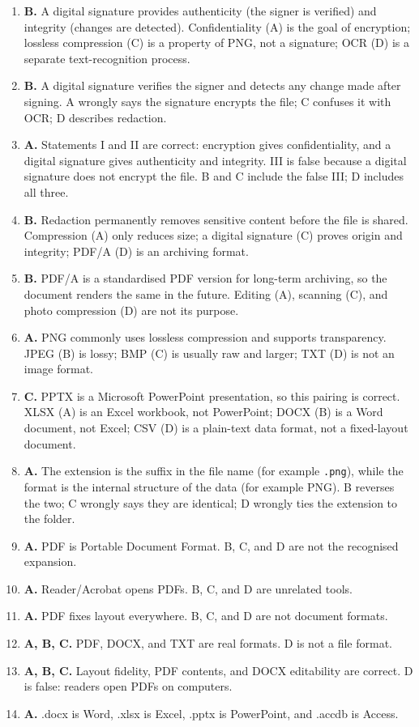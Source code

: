 \begin{enumerate}[label=\textbf{Q\arabic*.}, leftmargin=*]
  (B) and integrity (C) are the goals of a digital signature; compression (D)
  is unrelated to password protection.
\item \textbf{B.} A digital signature provides authenticity (the signer is
  verified) and integrity (changes are detected). Confidentiality (A) is the
  goal of encryption; lossless compression (C) is a property of PNG, not a
  signature; OCR (D) is a separate text-recognition process.
\item \textbf{B.} A digital signature verifies the signer and detects any
  change made after signing. A wrongly says the signature encrypts the file;
  C confuses it with OCR; D describes redaction.
\item \textbf{A.} Statements I and II are correct: encryption gives
  confidentiality, and a digital signature gives authenticity and integrity.
  III is false because a digital signature does not encrypt the file. B and C
  include the false III; D includes all three.
\item \textbf{B.} Redaction permanently removes sensitive content before the
  file is shared. Compression (A) only reduces size; a digital signature (C)
  proves origin and integrity; PDF/A (D) is an archiving format.
\item \textbf{B.} PDF/A is a standardised PDF version for long-term
  archiving, so the document renders the same in the future. Editing (A),
  scanning (C), and photo compression (D) are not its purpose.
\item \textbf{A.} PNG commonly uses lossless compression and supports
  transparency. JPEG (B) is lossy; BMP (C) is usually raw and larger; TXT (D)
  is not an image format.
\item \textbf{C.} PPTX is a Microsoft PowerPoint presentation, so this pairing
  is correct. XLSX (A) is an Excel workbook, not PowerPoint; DOCX (B) is a
  Word document, not Excel; CSV (D) is a plain-text data format, not a
  fixed-layout document.
\item \textbf{A.} The extension is the suffix in the file name (for example
  \texttt{.png}), while the format is the internal structure of the data
  (for example PNG). B reverses the two; C wrongly says they are identical;
  D wrongly ties the extension to the folder.

\item \textbf{A.} PDF is Portable Document Format. B, C, and D are not the recognised expansion.
\item \textbf{A.} Reader/Acrobat opens PDFs. B, C, and D are unrelated tools.
\item \textbf{A.} PDF fixes layout everywhere. B, C, and D are not document formats.
\item \textbf{A, B, C.} PDF, DOCX, and TXT are real formats. D is not a file format.
\item \textbf{A, B, C.} Layout fidelity, PDF contents, and DOCX editability are correct. D is false: readers open PDFs on computers.
\item \textbf{A.} .docx is Word, .xlsx is Excel, .pptx is PowerPoint, and .accdb is Access.


\end{enumerate}

